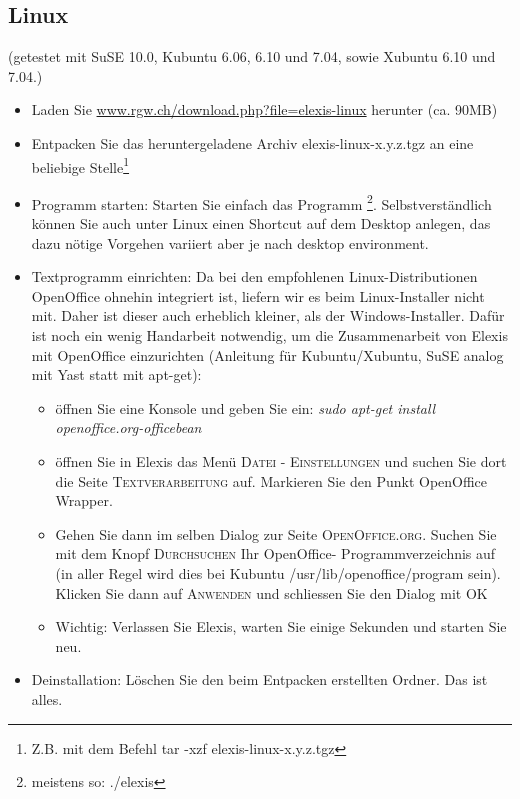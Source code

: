 \subsection{Linux}
(getestet mit SuSE 10.0, Kubuntu 6.06, 6.10 und 7.04, sowie  Xubuntu 6.10 und
7.04.)
\begin{itemize}
	\item Laden Sie \href{http://www.rgw.ch/download.php?file=elexis-linux}{www.rgw.ch/download.php?file=elexis-linux} herunter (ca. 90MB)
	\item Entpacken Sie das	heruntergeladene Archiv	elexis-linux-x.y.z.tgz an eine beliebige Stelle\footnote{Z.B. mit dem Befehl tar -xzf elexis-linux-x.y.z.tgz}
    \item Programm starten: Starten Sie einfach das Programm \footnote{meistens so: ./elexis}. Selbstverständlich können Sie auch unter Linux einen Shortcut auf dem Desktop
    anlegen, das dazu nötige Vorgehen variiert aber je nach desktop environment.

 	\item Textprogramm einrichten: Da bei den empfohlenen Linux-Distributionen
 	Open\-Of\-fi\-ce ohnehin integriert ist, liefern wir es beim Linux-Installer nicht
 	mit. Daher ist dieser auch erheblich kleiner, als der Windows-Installer. Dafür
 	ist noch ein wenig 	\glqq Handarbeit\grqq{} notwendig, um die Zusammenarbeit
 	von Elexis mit OpenOffice einzurichten (Anleitung für Kubuntu/Xubuntu, SuSE
 	analog mit Yast statt mit apt-get):
	\begin{itemize}
	 	\item öffnen Sie eine Konsole und geben Sie ein: \textit{sudo apt-get in\-stall
	 	openoffice.org-office\-bean}
		\item öffnen Sie in Elexis das Menü \textsc{Datei - Einstellungen} und suchen
		Sie dort die Seite \textsc{Textverarbeitung} auf. Markieren Sie den Punkt
		\glqq Open\-Of\-fice Wrap\-per\grqq{}.
		\item Gehen Sie dann im selben Dialog zur Seite \textsc{OpenOffice.org}.
		Suchen Sie mit dem Knopf \textsc{Durchsuchen} Ihr OpenOffice-
		Programmverzeichnis auf (in aller Regel wird dies bei Kubuntu
		/usr/lib/openoffice/program sein). Klicken Sie dann auf \textsc{Anwenden} und
		schliessen Sie den Dialog mit \textsc{OK}
		\item Wichtig: Verlassen Sie Elexis, warten Sie einige Sekunden und starten
		Sie neu.
    \end{itemize}
  \item Deinstallation: Löschen Sie den beim Entpacken erstellten Ordner. Das
 ist alles.
\end{itemize}

